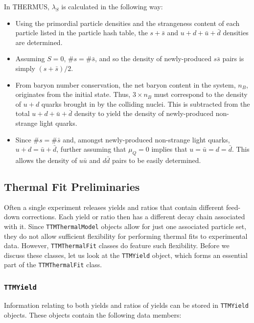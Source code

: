 \documentclass{elsarticle}
\begin{document}
In THERMUS, $\lambda_S$ is calculated in the following way:
\begin{itemize}

\item{Using the primordial particle densities and the strangeness content of each particle listed 
in the particle hash table, the $s + 
    \bar{s}$ and $u + d + \bar{u} + \bar{d}$ densities are determined.}
    \item{Assuming $S=0$, $\#s = \#\bar{s}$, and so the density of
    newly-produced $s\bar{s}$ pairs is simply $(s + \bar{s})/2$}.
  \item{From baryon number conservation, the net baryon content in the system, $n_B$, originates from the initial state. Thus, $3\times n_B$ must correspond to the density of
  $u+d$ quarks brought in by the colliding nuclei. This is subtracted from the total
  $u + d + \bar{u} + \bar{d}$ density to yield the density of newly-produced non-strange light quarks.}
\item{Since $\#s=\#\bar{s}$ and, amongst newly-produced non-strange light
  quarks, $u+d=\bar{u}+\bar{d}$, further assuming that $\mu_Q=0$
  implies that $u=\bar{u}=d=\bar{d}$. This allows the density of
  $u\bar{u}$ and $d\bar{d}$ pairs to be easily determined.}
\end{itemize}

\subsection{Thermal Fit Preliminaries}

Often a single experiment releases yields and ratios that contain different feed-down 
corrections. Each yield or ratio then has a different decay chain associated with it. Since \texttt{TTMThermalModel} objects allow for just one associated particle set, they do not allow sufficient flexibility for performing thermal fits to experimental 
data. However, \texttt{TTMThermalFit} classes do feature such flexibility. Before we discuss these classes, let us look at the \texttt{TTMYield} object, which forms an essential part of the \texttt{TTMThermalFit} class.\\

\subsubsection{\texttt{TTMYield}}

Information relating to both yields and ratios of yields can be stored in \texttt{TTMYield} objects. These 
objects contain the following data members:\\
\end{document}
